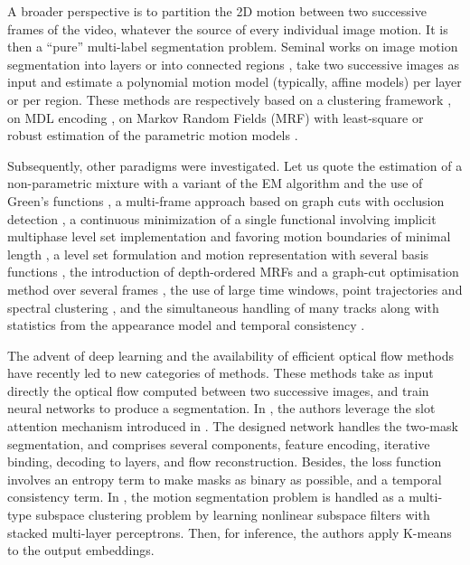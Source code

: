 \documentclass[10pt,twocolumn,letterpaper]{article}
\begin{document}
A broader perspective is to partition the 2D motion between two successive frames of the video, whatever the source of every individual image motion. It is then a ``pure'' multi-label segmentation problem. Seminal works on image motion segmentation into layers \cite{wang_representing_1994,ayer1995} or into connected regions \cite{PB-EF1993,odobez_mrf-based_1995}, take two successive images as input and estimate a polynomial motion model (typically, affine models) per layer or per region. These methods are respectively based on a clustering framework \cite{wang_representing_1994}, on MDL encoding \cite{ayer1995}, on Markov Random Fields (MRF) with least-square \cite{PB-EF1993} or robust estimation of the parametric motion models \cite{odobez_mrf-based_1995}.

Subsequently, other paradigms were investigated. Let us quote the estimation of a non-parametric mixture with a variant of the EM algorithm and the use of Green’s functions \cite{weiss1997}, a multi-frame approach based on graph cuts with occlusion detection \cite{xiao-shah2005}, a continuous minimization of a single functional involving implicit multiphase level set implementation and favoring motion boundaries of minimal length \cite{cremers2005}, a level set formulation and motion representation with several basis functions \cite{vazquez2006}, the introduction of depth-ordered MRFs and a graph-cut optimisation method over several frames \cite{sun2012}, the use of large time windows, point trajectories and spectral clustering \cite{ochs2014}, and the simultaneous handling of many tracks along with statistics from the appearance model and temporal consistency \cite{li-SegTrackv2-2013}.

The advent of deep learning and the availability of efficient optical flow methods have recently led to new categories of methods. These methods take as input directly the optical flow computed between two successive images, and train neural networks to produce a segmentation. In \cite{yang_motion-grouping_2021}, the authors leverage the slot attention mechanism introduced in \cite{locatello2020}. The designed network handles the two-mask segmentation, and comprises several components, feature encoding, iterative binding, decoding to layers, and flow reconstruction. Besides, the loss function involves an entropy term to make masks as binary as possible, and a temporal consistency term. In \cite{xu2021}, the motion segmentation problem is handled as a multi-type subspace clustering problem by learning nonlinear subspace filters with stacked multi-layer perceptrons. Then, for inference, the authors apply K-means to the output embeddings.
\end{document}
